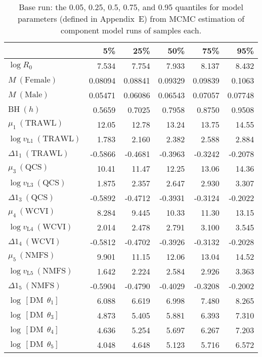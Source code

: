 \documentclass[11pt]{book}
\newcommand{\AppEqn}{Appendix~E}
\begin{document}


\setlength{\tabcolsep}{6pt}
\begin{table}[ht]
\centering
\caption{Base run: the 0.05, 0.25, 0.5, 0.75, and 0.95 quantiles for  model parameters (defined in \AppEqn) from MCMC estimation of  component model runs of \Nmcmc{} samples each.} 
\label{tab:car.base.pars}
\begin{tabular}{lrrrrr}
  \\[-1.0ex] \hline
 & 5\% & 25\% & 50\% & 75\% & 95\% \\ 
  \hline
$\log R_{0}$ & 7.534 & 7.754 & 7.933 & 8.137 & 8.432 \\ 
  $M~(\text{Female})$ & 0.08094 & 0.08841 & 0.09329 & 0.09839 & 0.1063 \\ 
  $M~(\text{Male})$ & 0.05471 & 0.06086 & 0.06543 & 0.07057 & 0.07748 \\ 
  $\text{BH}~(h)$ & 0.5659 & 0.7025 & 0.7958 & 0.8750 & 0.9508 \\ 
  $\mu_{1}~(\text{TRAWL})$ & 12.05 & 12.78 & 13.24 & 13.75 & 14.55 \\ 
  $\log v_{\text{L}1}~(\text{TRAWL})$ & 1.783 & 2.160 & 2.382 & 2.588 & 2.884 \\ 
  $\Delta1_{1}~(\text{TRAWL})$ & -0.5866 & -0.4681 & -0.3963 & -0.3242 & -0.2078 \\ 
  $\mu_{3}~(\text{QCS})$ & 10.41 & 11.47 & 12.25 & 13.06 & 14.36 \\ 
  $\log v_{\text{L}3}~(\text{QCS})$ & 1.875 & 2.357 & 2.647 & 2.930 & 3.307 \\ 
  $\Delta1_{3}~(\text{QCS})$ & -0.5892 & -0.4712 & -0.3931 & -0.3124 & -0.2022 \\ 
  $\mu_{4}~(\text{WCVI})$ & 8.284 & 9.445 & 10.33 & 11.30 & 13.15 \\ 
  $\log v_{\text{L}4}~(\text{WCVI})$ & 2.014 & 2.478 & 2.791 & 3.100 & 3.545 \\ 
  $\Delta1_{4}~(\text{WCVI})$ & -0.5812 & -0.4702 & -0.3926 & -0.3132 & -0.2028 \\ 
  $\mu_{5}~(\text{NMFS})$ & 9.901 & 11.15 & 12.06 & 13.04 & 14.52 \\ 
  $\log v_{\text{L}5}~(\text{NMFS})$ & 1.642 & 2.224 & 2.584 & 2.926 & 3.363 \\ 
  $\Delta1_{5}~(\text{NMFS})$ & -0.5904 & -0.4790 & -0.4029 & -0.3208 & -0.2002 \\ 
  $\log\,[\text{DM}~~\theta_1]$ & 6.088 & 6.619 & 6.998 & 7.480 & 8.265 \\ 
  $\log\,[\text{DM}~~\theta_3]$ & 4.873 & 5.405 & 5.881 & 6.393 & 7.310 \\ 
  $\log\,[\text{DM}~~\theta_4]$ & 4.636 & 5.254 & 5.697 & 6.267 & 7.203 \\ 
  $\log\,[\text{DM}~~\theta_5]$ & 4.048 & 4.648 & 5.123 & 5.716 & 6.572 \\ 
   \hline
\end{tabular}
\end{table}
\end{document}
